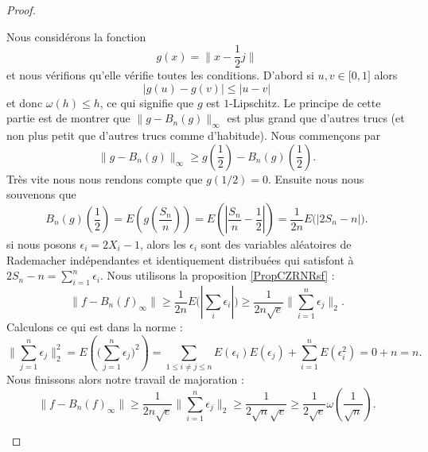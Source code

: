 \begin{proof}
\begin{enumerate}
        Nous considérons la fonction 
        \begin{equation}
            g(x)=\| x-\frac{ 1 }{2}j \|
        \end{equation}
        et nous vérifions qu'elle vérifie toutes les conditions. D'abord si \( u,v\in\mathopen[ 0 , 1 \mathclose]\) alors
        \begin{equation}
            \big| g(u)-g(v) \big|\leq | u-v |
        \end{equation}
        et donc \( \omega(h)\leq h\), ce qui signifie que \( g\) est \( 1\)-Lipschitz. Le principe de cette partie est de montrer que \( \| g-B_n(g) \|_{\infty}\) est plus grand que d'autres trucs (et non plus petit que d'autres trucs comme d'habitude). Nous commençons par
        \begin{equation}
            \| g-B_n(g) \|_{\infty}\geq g(\frac{ 1 }{2})-B_n(g)( \frac{ 1 }{2} ).
        \end{equation}
        Très vite nous nous rendons compte que \( g(1/2)=0\). Ensuite nous nous souvenons que
        \begin{equation}
            B_n(g)(\frac{ 1 }{2})=E\left( g(\frac{ S_n }{ n }) \right)=E\left( | \frac{ S_n }{ n }-\frac{ 1 }{2} | \right)=\frac{1}{ 2n }E\big( | 2S_n-n | \big).
        \end{equation}
        si nous posons \( \epsilon_i=2X_i-1\), alors les \( \epsilon_i\) sont des variables aléatoires de Rademacher indépendantes et identiquement distribuées qui satisfont à \( 2S_n-n=\sum_{i=1}^n\epsilon_i\). Nous utilisons la proposition \ref{PropCZRNRsf} :
        \begin{equation}
            \| f-B_n(f)_{\infty} \|\geq \frac{1}{ 2n }E\big( | \sum_i\epsilon_i | \big)\geq\frac{1}{ 2n\sqrt{e} }\big\| \sum_{i=1}^n\epsilon_j \big\|_2.
        \end{equation}
        Calculons ce qui est dans la norme :
        \begin{equation}
            \big\| \sum_{j=1}^n\epsilon_j \big\|_2^2=E\left( \big( \sum_{j=1}^n\epsilon_j \big)^2 \right)=\sum_{1\leq i\neq j\leq n}E(\epsilon_i)E(\epsilon_j)+\sum_{i=1}^nE(\epsilon_i^2)=0+n=n.
        \end{equation}
        Nous finissons alors notre travail de majoration :
        \begin{equation}
            \| f-B_n(f)_{\infty} \|\geq\frac{1}{ 2n\sqrt{e} }\big\| \sum_{i=1}^n\epsilon_j \big\|_2\geq\frac{1}{ 2\sqrt{n}\sqrt{e} }\geq\frac{1}{ 2\sqrt{e} }\omega\left( \frac{1}{ \sqrt{n} } \right).
        \end{equation}
    \end{enumerate}
\end{proof}
